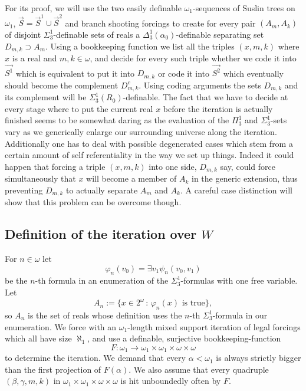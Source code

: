 \documentclass[a4paper,11pt]{article}
\begin{document}
For its proof, we will use the two easily definable $\omega_1$-sequences of Suslin trees on $\omega_1$, $\vec{S}=\vec{S}^1 \cup \vec{S}^2$ and branch shooting forcings to create for every pair $(A_m,A_k)$ of disjoint $\Sigma^1_3$-definable sets of reals a $\Delta_3^1 (\alpha_0)$-definable separating set $D_{m,k} \supset A_m$.
Using a bookkeeping function we list all the triples $(x,m,k)$ where $x$ is a real and $m, k\in \omega$, and decide for every such triple whether we code it into $\vec{S^1}$ which is equivalent to put it into $D_{m,k}$ or code it into $\vec{S^2}$ which eventually should become the complement $D_{m,k}^c$. Using coding arguments the sets $D_{m,k}$ and its complement will be $\Sigma^1_3(R_0)$-definable. The fact that we have to decide at every stage where to put the current real $x$ before the iteration is actually finished seems to be somewhat daring as the evaluation of the $\Pi^1_3$ and $\Sigma^1_3$-sets vary as we generically enlarge our surrounding universe along the iteration.
Additionally one has to deal with possible degenerated cases which stem from a certain amount of self referentiality in the way we set up things. Indeed it could happen that forcing a triple $(x,m,k)$ into one side, $D_{m,k}$ say, could force simultaneously that $x$ will become a member of $A_k$ in the generic extension, thus preventing $D_{m,k}$ to actually separate $A_m$ and $A_k$.
 A careful case distinction will show that this problem can be overcome though.



\subsection{Definition of the iteration over $W$}


For $n \in \omega$ let \[\varphi_n(v_0)= \exists v_1 \psi_n(v_0,v_1)\]  be the $n$-th formula in an enumeration of the $\Sigma^1_3$-formulas with one free variable. Let \[A_n:= \{ x \in 2^{\omega} \, : \, \varphi_n(x) \text{ is true} \},\] so $A_n$ is the set of reals whose definition uses the $n$-th $\Sigma^1_3$-formula in our enumeration. We force with an $\omega_1$-length
mixed support iteration of legal forcings which all have size $\aleph_1$, and use 
a definable, surjective bookkeeping-function \[ F: \omega_1 \rightarrow \omega_1  \times \omega_1 \times \omega \times \omega\]  to determine the iteration. We demand that every $\alpha < \omega_1$ is always strictly bigger than the first projection of $F(\alpha)$. We also assume that every quadruple $(\beta, \gamma, m,k)$ in $\omega_1  \times \omega_1 \times \omega \times \omega$ is hit unboundedly often by $F$.
\end{document}
